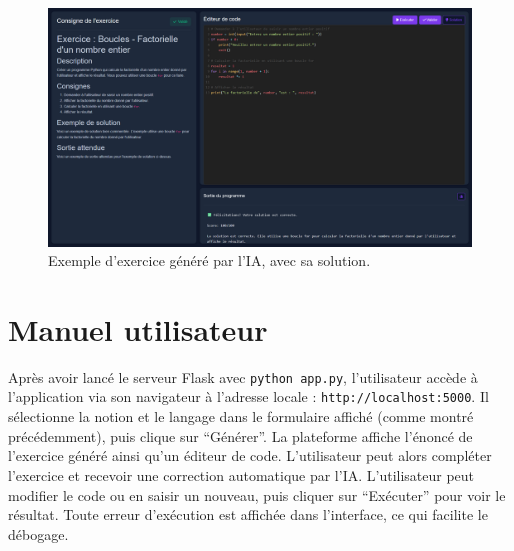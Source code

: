\documentclass[a4paper, 12pt, twoside]{article}
\begin{document}
\begin{figure}[h!]
\centering
\includegraphics[width=1.3\textwidth]{exercice.png}
\caption{Exemple d'exercice généré par l'IA, avec sa solution.}
\label{fig:exercice}
\end{figure}

	\section{Manuel utilisateur}
Après avoir lancé le serveur Flask avec \texttt{python app.py}, l'utilisateur accède à l'application via son navigateur à l'adresse locale : \texttt{http://localhost:5000}. Il sélectionne la notion et le langage dans le formulaire affiché (comme montré précédemment), puis clique sur ``Générer''. La plateforme affiche l'énoncé de l'exercice généré ainsi qu'un éditeur de code. L'utilisateur peut alors compléter l'exercice et recevoir une correction automatique par l'IA. L'utilisateur peut modifier le code ou en saisir un nouveau, puis cliquer sur ``Exécuter'' pour voir le résultat. Toute erreur d'exécution est affichée dans l'interface, ce qui facilite le débogage.
\end{document}
